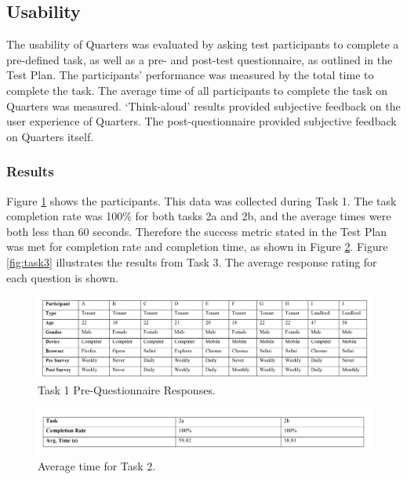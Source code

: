 \documentclass[12pt]{article}
\begin{document}
\subsection{Usability}
The usability of Quarters was evaluated by asking test participants to complete a pre-defined task, as well as a pre- and post-test questionnaire, as outlined in the Test Plan. The participants' performance was measured by the total time to complete the task. The average time of all participants to complete the task on Quarters was measured. ‘Think-aloud’ results provided subjective feedback on the user experience of Quarters. The post-questionnaire provided subjective feedback on Quarters itself.

\subsubsection{Results}
Figure \ref{fig:participants} shows the participants. This data was collected during Task 1. The task completion rate was 100\% for both tasks 2a and 2b, and the average times were both less than 60 seconds. Therefore the success metric stated in the Test Plan was met for completion rate and completion time, as shown in Figure \ref{fig:task2}. Figure \ref{fig:task3} illustrates the results from Task 3. The average response rating for each question is shown.

\begin{figure}[h]
    \centering
    \includegraphics[width=1\textwidth]{figures/participants.png}
    \caption{Task 1 Pre-Questionnaire Responses.}
    \label{fig:participants}
\end{figure}

\begin{figure}[h]
    \centering
    \includegraphics[width=1\textwidth]{figures/task2.png}
    \caption{Average time for Task 2.}
    \label{fig:task2}
\end{figure}
\end{document}
